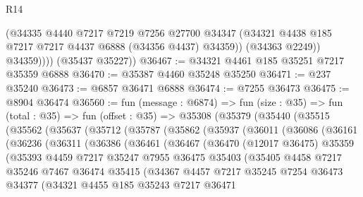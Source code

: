 \begin{lexlean}{R14}
\begin{coremodule}
                (@34335
                  @4440
                  @7217
                  @7219
                  @7256
                  @27700
                  @34347
                  (@34321 @4438 @185 @7217 @7217 @4437 @6888 (@34356 @4437) @34359))
                (@34363 @2249))
              @34359))))
      (@35437 @35227))
@36467 := @34321 @4461 @185 @35251 @7217 @35359 @6888
@36470 := @35387 @4460 @35248 @35250
@36471 := @237 @35240
@36473 := @6857 @36471 @6888
@36474 := @7255 @36473
@36475 := @8904 @36474
@36560 := fun (message : @6874) =>
  fun (size : @35) =>
  fun (total : @35) =>
  fun (offset : @35) =>
  @35308
    (@35379
      (@35440
        (@35515
          (@35562
            (@35637
              (@35712
                (@35787
                  (@35862
                    (@35937
                      (@36011
                        (@36086
                          (@36161
                            (@36236
                              (@36311
                                (@36386
                                  (@36461
                                    (@36467
                                      (@36470
                                        (@12017 @36475)
                                        @35359
                                        (@35393
                                          @4459
                                          @7217
                                          @35247
                                          @7955
                                          @36475
                                          @35403
                                          (@35405
                                            @4458
                                            @7217
                                            @35246
                                            @7467
                                            @36474
                                            @35415
                                            (@34367
                                              @4457
                                              @7217
                                              @35245
                                              @7254
                                              @36473
                                              @34377
                                              (@34321
                                                @4455
                                                @185
                                                @35243
                                                @7217
                                                @36471

\end{coremodule}
\end{lexlean}
